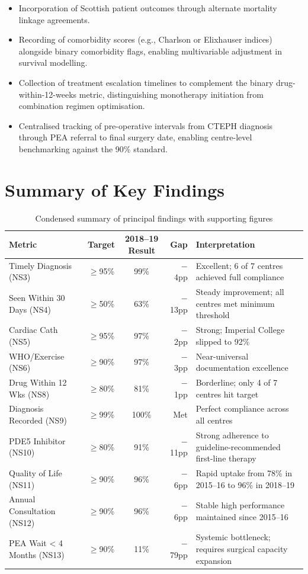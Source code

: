 \documentclass[11pt,a4paper]{article}
\begin{document}
\begin{itemize}[leftmargin=*]
\item Incorporation of Scottish patient outcomes through alternate mortality linkage agreements.
\item Recording of comorbidity scores (e.g., Charlson or Elixhauser indices) alongside binary comorbidity flags, enabling multivariable adjustment in survival modelling.
\item Collection of treatment escalation timelines to complement the binary drug-within-12-weeks metric, distinguishing monotherapy initiation from combination regimen optimisation.
\item Centralised tracking of pre-operative intervals from CTEPH diagnosis through PEA referral to final surgery date, enabling centre-level benchmarking against the 90\% standard.
\end{itemize}

\section{Summary of Key Findings}

\begin{table}[H]
\centering
\small
\caption{Condensed summary of principal findings with supporting figures}
\begin{tabularx}{\textwidth}{lccrX}
\toprule
Metric & Target & 2018--19 Result & Gap & Interpretation \\
\midrule
Timely Diagnosis (NS3) & $\geq$95\% & 99\% & $-$4pp & Excellent; 6 of 7 centres achieved full compliance \\
Seen Within 30 Days (NS4) & $\geq$50\% & 63\% & $-$13pp & Steady improvement; all centres met minimum threshold \\
Cardiac Cath (NS5) & $\geq$95\% & 97\% & $-$2pp & Strong; Imperial College slipped to 92\% \\
WHO/Exercise (NS6) & $\geq$90\% & 97\% & $-$3pp & Near-universal documentation excellence \\
Drug Within 12 Wks (NS8) & $\geq$80\% & 81\% & $-$1pp & Borderline; only 4 of 7 centres hit target \\
Diagnosis Recorded (NS9) & $\geq$99\% & 100\% & Met & Perfect compliance across all centres \\
PDE5 Inhibitor (NS10) & $\geq$80\% & 91\% & $-$11pp & Strong adherence to guideline-recommended first-line therapy \\
Quality of Life (NS11) & $\geq$90\% & 96\% & $-$6pp & Rapid uptake from 78\% in 2015--16 to 96\% in 2018--19 \\
Annual Consultation (NS12) & $\geq$90\% & 96\% & $-$6pp & Stable high performance maintained since 2015--16 \\
PEA Wait < 4 Months (NS13) & $\geq$90\% & 11\% & $-$79pp & Systemic bottleneck; requires surgical capacity expansion \\
\bottomrule
\end{tabularx}
\end{table}
\end{document}
